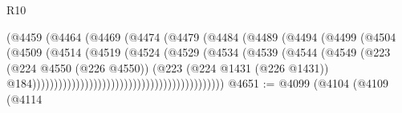\begin{lexlean}{R10}
\begin{coremodule}
{{{{{{{{{{{{{{{{{{{{{{{{{{{{{{{{{{{{{{{{{{{{{{{{{{{{{{{{{{{{{{{{{{{{{{{{{{{{{{{{{{{{                                                  (@4459
                                                    (@4464
                                                      (@4469
                                                        (@4474
                                                          (@4479
                                                            (@4484
                                                              (@4489
                                                                (@4494
                                                                  (@4499
                                                                    (@4504
                                                                      (@4509
                                                                        (@4514
                                                                          (@4519
                                                                            (@4524
                                                                              (@4529
                                                                                (@4534
                                                                                  (@4539
                                                                                    (@4544
                                                                                      (@4549
                                                                                        (@223
                                                                                          (@224
                                                                                            @4550
                                                                                            (@226
                                                                                              @4550))
                                                                                          (@223
                                                                                            (@224
                                                                                              @1431
                                                                                              (@226
                                                                                                @1431))
                                                                                            @184))))))))))))))))))))))))))))))))))))))))))))
@4651 := @4099
    (@4104
      (@4109
        (@4114
}}}}}}}}}}}}}}}}}}}}}}}}}}}}}}}}}}}}}}}}}}}}}}}}}}}}}}}}}}}}}}}}}}}}}}}}}}}}}}}}}}}}
\end{coremodule}
\end{lexlean}
